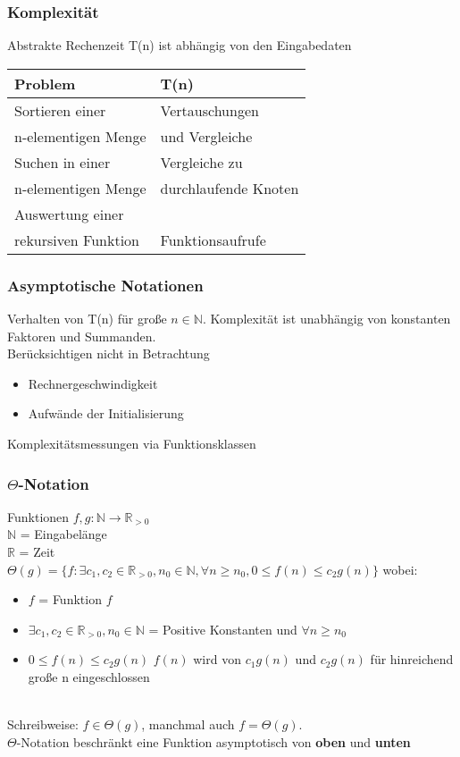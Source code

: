 \documentclass[jou,apacite]{apa6}
\begin{document}
\subsubsection{Komplexität}
Abstrakte Rechenzeit T(n) ist abhängig von den Eingabedaten
\begin{table}[h]
\centering
\begin{tabular}{|l|l|}
\hline
Problem     &   T(n)    \\
\hline
Sortieren einer   &   Vertauschungen \\ n-elementigen Menge &  und Vergleiche       \\
\hline
Suchen in einer  &   Vergleiche zu \\ n-elementigen Menge & durchlaufende Knoten  \\
\hline
Auswertung einer     & \\ rekursiven Funktion &   Funktionsaufrufe                \\
\hline
\end{tabular}
\end{table}

\subsubsection{Asymptotische Notationen}
Verhalten von T(n) für große $n \in \mathbb{N}$.
Komplexität ist unabhängig von konstanten Faktoren und Summanden. \\
Berücksichtigen nicht in Betrachtung
\begin{itemize}
    \item Rechnergeschwindigkeit 
    \item Aufwände der Initialisierung
\end{itemize}
Komplexitätsmessungen via Funktionsklassen \\


\subsubsection{$\Theta$-Notation} 
Funktionen $f,g: \mathbb{N} \to \mathbb{R}_{>0}$\\
$\mathbb{N}$ = Eingabelänge \\
$\mathbb{R}$ = Zeit 
\\
$\Theta(g) = \{f : \exists c_1,c_2\in\mathbb{R}_{>0},n_0\in\mathbb{N},\forall n\geq n_0,0\leq f(n) \leq c_2g(n)\}$
wobei:
\begin{itemize}
    \item $f$ = Funktion $f$
    \item $\exists c_1,c_2\in\mathbb{R}_{>0},n_0\in\mathbb{N}$ = Positive Konstanten und $\forall n\geq n_0$
    \item $0\leq f(n) \leq c_2g(n)$ $f(n)$ wird von $c_1g(n)$ und $c_2g(n)$ für hinreichend große n eingeschlossen
\end{itemize}
\\
Schreibweise: $f\in \Theta(g)$, manchmal auch $f= \Theta(g)$. \\
$\Theta$-Notation beschränkt eine Funktion asymptotisch von {\bfseries oben} und {\bfseries unten}
\\
\end{document}
